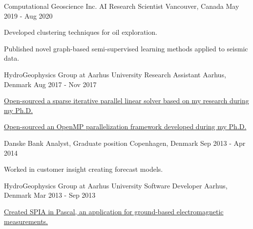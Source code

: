 \begin{cventries}
  \cventry
  {Computational Geoscience Inc.} %
  {AI Research Scientist} %
    {Vancouver, Canada} %
    {May 2019 - Aug 2020} %
    {
      \begin{cvitems} %
        \item {Developed clustering techniques for oil exploration.}
        \item {Published novel graph-based semi-supervised learning methods applied to seismic data.}
      \end{cvitems}
    }

  \cventry
  {HydroGeophysics Group at Aarhus University} %
  {Research Assistant} %
    {Aarhus, Denmark} %
    {Aug 2017 - Nov 2017} %
    {
      \begin{cvitems} %
        \item {\href{https://github.com/tueboesen/Sparse-iterative-parallel-linear-solver}{Open-sourced a sparse iterative parallel linear solver based on my research during my Ph.D.}}
        \item {\href{https://github.com/tueboesen/Parallelization-Framework}{Open-sourced an OpenMP parallelization framework developed during my Ph.D.}}
      \end{cvitems}
    }

  \cventry
  {Danske Bank} %
  {Analyst, Graduate position} %
    {Copenhagen, Denmark} %
    {Sep 2013 - Apr 2014} %
    {
      \begin{cvitems} %
        \item {Worked in customer insight creating forecast models.}
      \end{cvitems}
    }

  \cventry
  {HydroGeophysics Group at Aarhus University} %
  {Software Developer} %
    {Aarhus, Denmark} %
    {Mar 2013 - Sep 2013} %
    {
      \begin{cvitems} %
        \item {\href{https://hgg.au.dk/software/spia}{Created SPIA in Pascal, an application for ground-based electromagnetic measurements.}}
      \end{cvitems}
    }


\end{cventries}
